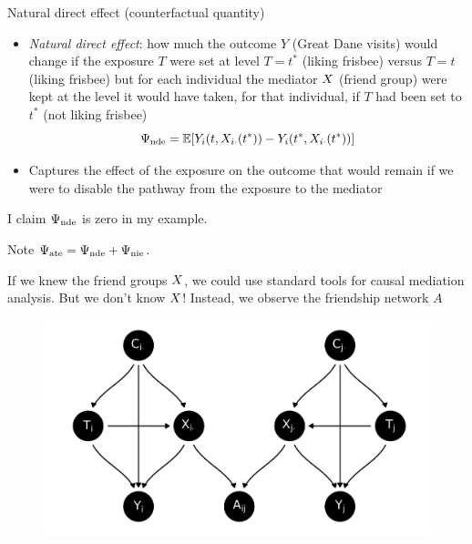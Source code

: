\documentclass{beamer}
\theoremstyle{remark}
\begin{document}
\begin{frame}{Natural direct effect (counterfactual quantity)}

    \begin{itemize}
        \item \emph{Natural direct effect}: how much the outcome $Y$ (Great Dane visits) would change if the exposure $T$ were set at level $T = t^*$ (liking frisbee) versus $T = t$ (liking frisbee) but for each individual the mediator $X$ (friend group) were kept at the level it would have taken, for that individual, if $T$ had been set to $t^*$ (not liking frisbee)
              \begin{equation*}
                  \nde = \E{Y_i (t, \X_{i \cdot}(t^*)) - Y_i (t^*, \X_{i \cdot} (t^*))}
              \end{equation*}
        \item Captures the effect of the exposure on the outcome that would remain if we were to disable the pathway from the exposure to the mediator
    \end{itemize}

    I claim $\Psi_\mathrm{nde}$ is zero in my example.

    Note $\Psi_\mathrm{ate} = \Psi_\mathrm{nde} + \Psi_\mathrm{nie}$.

\end{frame}

\begin{frame}{If we knew the friend groups $X$, we could use standard tools for causal mediation analysis. But we don't know $X$! Instead, we observe the friendship network $A$}

    \centering

    \begin{figure}
        \includegraphics[scale=0.65]{figures/dags/mediating-5.png}
        \label{fig:mediating-5-again}
    \end{figure}

\end{frame}
\end{document}
